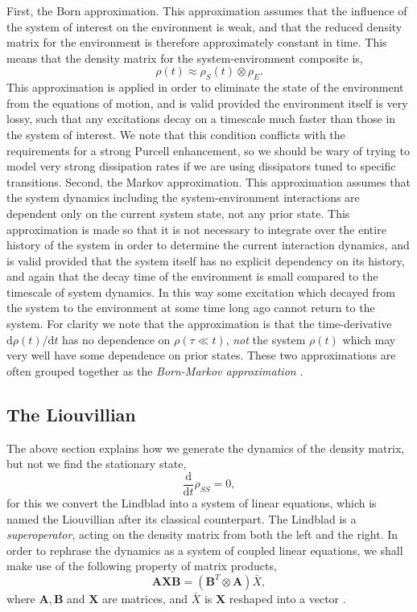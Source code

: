 First, the Born approximation. This approximation assumes that the influence of the system of interest on the environment is weak, and that the reduced density matrix for the environment is therefore approximately constant in time. This means that the density matrix for the system-environment composite is,
\begin{equation}
	\rho(t) \approx \rho_{S}(t) \otimes \rho_{E}.
	\label{eq:oqs3-3}
\end{equation} 
This approximation is applied in order to eliminate the state of the environment from the equations of motion, and is valid provided the environment itself is very lossy, such that any excitations decay on a timescale much faster than those in the system of interest. We note that this condition conflicts with the requirements for a strong Purcell enhancement, so we should be wary of trying to model very strong dissipation rates if we are using dissipators tuned to specific transitions. Second, the Markov approximation. This approximation assumes that the system dynamics including the system-environment interactions are dependent only on the current system state, not any prior state. This approximation is made so that it is not necessary to integrate over the entire history of the system in order to determine the current interaction dynamics, and is valid provided that the system itself has no explicit dependency on its history, and again that the decay time of the environment is small compared to the timescale of system dynamics. In this way some excitation which decayed from the system to the environment at some time long ago cannot return to the system. For clarity we note that the approximation is that the time-derivative \(\mathrm{d}\rho(t)/\mathrm{d}t\) has no dependence on \(\rho(\tau \ll t)\), \emph{not} the system \(\rho(t)\) which may very well have some dependence on prior states. These two approximations are often grouped together as the \emph{Born-Markov approximation} \cite{BP_BMS}.

\subsection{The Liouvillian}
The above section explains how we generate the dynamics of the density matrix, but not we find the stationary state,
\begin{equation}
	\frac{\mathrm{d}}{\mathrm{d}t}\rho_{SS} = 0,
	\label{eq:oqs4-1}
\end{equation}
for this we convert the Lindblad into a system of linear equations, which is named the Liouvillian after its classical counterpart. The Lindblad is a \emph{superoperator}, acting on the density matrix from both the left and the right. In order to rephrase the dynamics as a system of coupled linear equations, we shall make use of the following property of matrix products,
\begin{equation}
	 \mathbf{A}\mathbf{X}\mathbf{B} = \left(\mathbf{B}^{T} \otimes \mathbf{A}\right)\bar{X},
	 \label{eq:oqs4-2}
\end{equation}
 where \(\mathbf{A}, \mathbf{B}\) and \(\mathbf{X}\) are matrices, and \(\bar{X}\) is \(\mathbf{X}\) reshaped into a vector \cite{MO13,Roth34}. 
 
